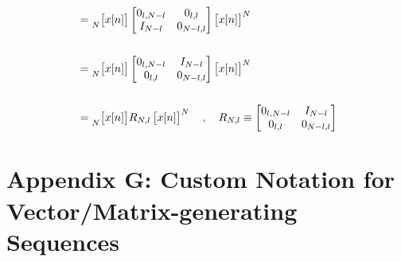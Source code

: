 \documentclass{article}
\begin{document}
\begin{align*}
             &=\prescript{}{N}{\begin{bmatrix} x[n] \end{bmatrix}}\begin{bmatrix}
                                                                        0_{l, N - l} & 0_{    l, l} \\
                                                                        I_{   N - l} & 0_{N - l, l}
                                                                    \end{bmatrix}\begin{bmatrix} x[n] \end{bmatrix}^{N} \\ \\
             &=\prescript{}{N}{\begin{bmatrix} x[n] \end{bmatrix}}\begin{bmatrix}
                                                                        0_{l, N - l} & I_{N - l} \\
                                                                        0_{l,     l} & 0_{N - l, l}
                                                                    \end{bmatrix}\begin{bmatrix} x[n] \end{bmatrix}^{N} \\ \\
             &=\prescript{}{N}{\begin{bmatrix} x[n] \end{bmatrix}}R_{N, l}\begin{bmatrix} x[n] \end{bmatrix}^{N} \quad, \quad R_{N, l} \equiv \begin{bmatrix}
                                                                                                                                                    0_{l, N - l} & I_{N - l} \\
                                                                                                                                                    0_{l,     l} & 0_{N - l, l}
                                                                                                                                                \end{bmatrix}
  \end{align*}

\newpage
\section*{Appendix G: Custom Notation for Vector/Matrix-generating Sequences}
\end{document}
